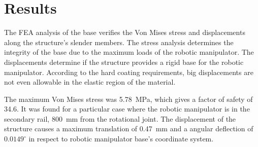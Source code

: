 \section{Results}




The FEA analysis of the base verifies the Von Mises stress and displacements
along the structure's slender members. The stress analysis determines the
integrity of the base due to the maximum loads of the robotic manipulator. The
displacements determine if the structure provides a rigid base for the robotic
manipulator. According to the hard coating requirements, big displacements are
not even allowable in the elastic region of the material. %

The maximum Von Mises stress was 5.78~MPa, which gives a factor of safety of
34.6. It was found for a particular case where the robotic manipulator is in
the secondary rail, 800~mm from the rotational joint. The displacement of the
structure causes a maximum translation of 0.47~mm and a angular deflection of
$0.0149^{\circ}$ in respect to robotic manipulator base's coordinate system.

